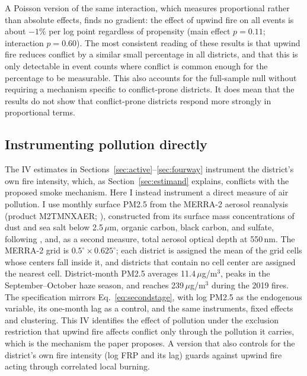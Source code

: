\documentclass[12pt]{article}
\begin{document}
A Poisson version of the same interaction, which measures proportional rather than absolute effects, finds no gradient: the effect of upwind fire on all events is about $-1\%$ per log point regardless of propensity (main effect $p=0.11$; interaction $p=0.60$). The most consistent reading of these results is that upwind fire reduces conflict by a similar small percentage in all districts, and that this is only detectable in event counts where conflict is common enough for the percentage to be measurable. This also accounts for the full-sample null without requiring a mechanism specific to conflict-prone districts. It does mean that the results do not show that conflict-prone districts respond more strongly in proportional terms.

\subsection{Instrumenting pollution directly}
\label{sec:pollution}

The IV estimates in Sections~\ref{sec:active}--\ref{sec:fourway} instrument the district's own fire intensity, which, as Section~\ref{sec:estimand} explains, conflicts with the proposed smoke mechanism. Here I instead instrument a direct measure of air pollution. I use monthly surface PM2.5 from the MERRA-2 aerosol reanalysis (product M2TMNXAER; \citealp{gelaro2017merra}), constructed from its surface mass concentrations of dust and sea salt below 2.5\,$\mu$m, organic carbon, black carbon, and sulfate, following \citet{buchard2016}, and, as a second measure, total aerosol optical depth at 550\,nm. The MERRA-2 grid is $0.5^{\circ} \times 0.625^{\circ}$; each district is assigned the mean of the grid cells whose centers fall inside it, and districts that contain no cell center are assigned the nearest cell. District-month PM2.5 averages 11.4\,$\mu$g/m$^3$, peaks in the September--October haze season, and reaches 239\,$\mu$g/m$^3$ during the 2019 fires. The specification mirrors Eq.~\eqref{eq:secondstage}, with log PM2.5 as the endogenous variable, its one-month lag as a control, and the same instruments, fixed effects and clustering. This IV identifies the effect of pollution under the exclusion restriction that upwind fire affects conflict only through the pollution it carries, which is the mechanism the paper proposes. A version that also controls for the district's own fire intensity (log FRP and its lag) guards against upwind fire acting through correlated local burning.
\end{document}
